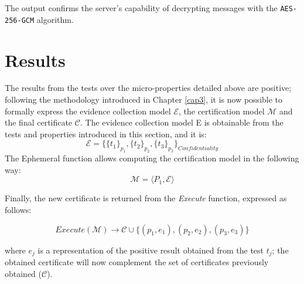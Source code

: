 The output confirms the server's capability of decrypting messages with the \texttt{AES-256-GCM} algorithm.





\section{Results}
The results from the tests over the micro-properties detailed above are positive; following the methodology introduced in Chapter \ref{cap3}, it is now possible to formally express the evidence collection model \(\mathcal{E}\), the certification model \(\mathcal{M}\) and the final certificate \(\mathcal{C}\). The evidence collection model E is obtainable from the tests and properties introduced in this section, and it is: 
\[ \mathcal{E} = \{ \{t_1\}_{p_1}, \{t_2\}_{p_2}, \{t_3\}_{p_3} \}_{Confidentiality}\]
The Ephemeral function allows computing the certification model in the following way:
\[\mathcal{M} = \langle P_1, \mathcal{E} \rangle\]

Finally, the new certificate is returned from the \textit{Execute} function, expressed as follows: 

\[Execute(\mathcal{M}) \rightarrow \mathcal{C} \cup \{(p_1, e_1), (p_2, e_2), (p_3, e_3)\}\]

where \(e_j\) is a representation of the positive result obtained from the test \(t_j\); the obtained certificate will now complement the set of certificates previously obtained (\(\mathcal{C}\)).